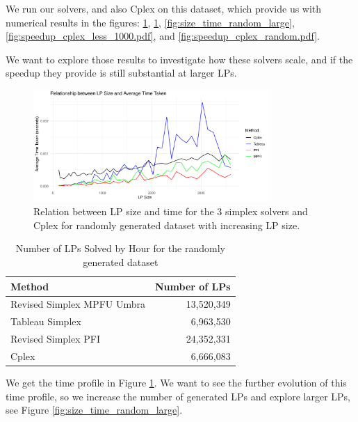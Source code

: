 We run our solvers, and also Cplex on this dataset, which provide us with numerical results
in the figures: \ref{fig:time_vs_size_random}, \ref{fig:lps_per_hour_random}, \ref{fig:size_time_random_large},
\ref{fig:speedup_cplex_less_1000.pdf}, and \ref{fig:speedup_cplex_random.pdf}.

We want to
explore those results to investigate how these solvers scale, and if the speedup
they provide is still substantial at larger LPs.


\begin{figure}[!htb]
    \centering
    \includegraphics[width=0.8\textwidth]{figures/time_vs_size_random.pdf}
    \caption{Relation between LP size and time for the 3 simplex solvers and Cplex for randomly generated
        dataset with increasing LP size.}
    \label{fig:time_vs_size_random}
\end{figure}


\begin{table}[!htb]
    \centering
    \caption{Number of LPs Solved by Hour for the randomly generated dataset}
    \begin{tabular}{l|r}
        \toprule
        Method                     & Number of LPs \\
        \midrule
        Revised Simplex MPFU Umbra & 13,520,349    \\
        Tableau Simplex            & 6,963,530     \\
        Revised Simplex PFI        & 24,352,331    \\
        Cplex                      & 6,666,083     \\
        \bottomrule
    \end{tabular}
    \label{fig:lps_per_hour_random}
\end{table} 

We get the time profile in Figure \ref{fig:time_vs_size_random}.
We want to see the further evolution of this time profile, so we increase the number of generated LPs
and explore larger LPs, see Figure \ref{fig:size_time_random_large}.


